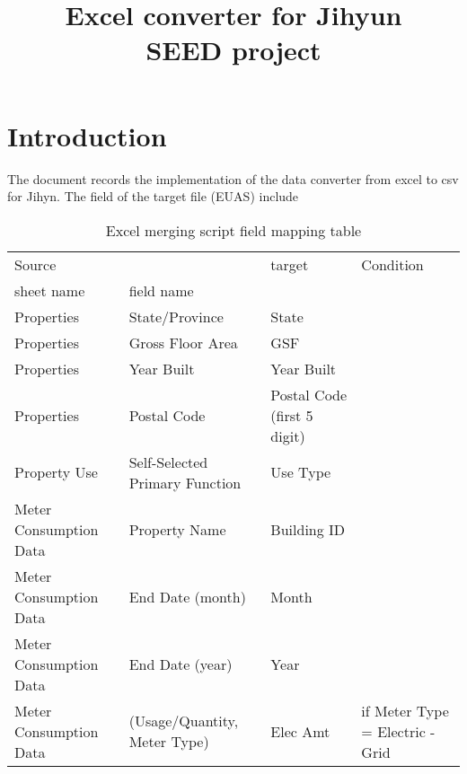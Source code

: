 \documentclass[12pt]{article}
\begin{document}
\title{Excel converter for Jihyun\\
       \large SEED project}
\maketitle
\tableofcontents
\newpage
\section{Introduction}\label{sec:intro}
The document records the implementation of the data converter from
excel to csv for Jihyn. The field of the target file (EUAS) include
\begin{table}[h!]
  \footnotesize
\centering
\caption{Excel merging script field mapping table}
\label{my-label}
\begin{tabular}{p{3cm}p{3cm}|p{3cm}|p{5cm}}
Source                 &                              & target                      & Condition                   \\
sheet name             & field name                   &                             &                             \\
  \hline
  \hline
Properties             & State/Province               & State                       &                             \\
  \hline
Properties             & Gross Floor Area             & GSF                         &                             \\
  \hline
Properties             & Year Built                   & Year Built                  &                             \\
  \hline
Properties             & Postal Code                  & Postal Code (first 5 digit) &                           \\ 
  \hline
Property Use & Self-Selected Primary Function         & Use Type                    \\ 
  \hline
  \hline
Meter Consumption Data & Property Name                & Building ID                 &                             \\
  \hline
Meter Consumption Data & End Date (month)             & Month                       &                             \\
  \hline
Meter Consumption Data & End Date (year)             & Year                        &                             \\
  \hline
Meter Consumption Data & (Usage/Quantity, Meter Type) & Elec Amt                    & if Meter Type = Electric - Grid\\

\end{tabular}
\end{table}
\end{document}
